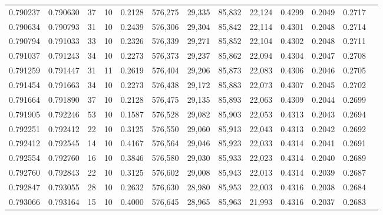 \begin{tabular}{rrrrrrrrrrrrr}
0.790237 & 0.790630 &    37 &  10 &                                     0.2128 & 576,275 &  29,335 &  85,832 &  22,124 & 0.4299 & 0.2049 & 0.2717 \\
0.790634 & 0.790793 &    31 &  10 &                                     0.2439 & 576,306 &  29,304 &  85,842 &  22,114 & 0.4301 & 0.2048 & 0.2714 \\
0.790794 & 0.791033 &    33 &  10 &                                     0.2326 & 576,339 &  29,271 &  85,852 &  22,104 & 0.4302 & 0.2048 & 0.2711 \\
0.791037 & 0.791243 &    34 &  10 &                                     0.2273 & 576,373 &  29,237 &  85,862 &  22,094 & 0.4304 & 0.2047 & 0.2708 \\
0.791259 & 0.791447 &    31 &  11 &                                     0.2619 & 576,404 &  29,206 &  85,873 &  22,083 & 0.4306 & 0.2046 & 0.2705 \\
0.791454 & 0.791663 &    34 &  10 &                                     0.2273 & 576,438 &  29,172 &  85,883 &  22,073 & 0.4307 & 0.2045 & 0.2702 \\
0.791664 & 0.791890 &    37 &  10 &                                     0.2128 & 576,475 &  29,135 &  85,893 &  22,063 & 0.4309 & 0.2044 & 0.2699 \\
0.791905 & 0.792246 &    53 &  10 &                                     0.1587 & 576,528 &  29,082 &  85,903 &  22,053 & 0.4313 & 0.2043 & 0.2694 \\
0.792251 & 0.792412 &    22 &  10 &                                     0.3125 & 576,550 &  29,060 &  85,913 &  22,043 & 0.4313 & 0.2042 & 0.2692 \\
0.792412 & 0.792545 &    14 &  10 &                                     0.4167 & 576,564 &  29,046 &  85,923 &  22,033 & 0.4314 & 0.2041 & 0.2691 \\
0.792554 & 0.792760 &    16 &  10 &                                     0.3846 & 576,580 &  29,030 &  85,933 &  22,023 & 0.4314 & 0.2040 & 0.2689 \\
0.792760 & 0.792843 &    22 &  10 &                                     0.3125 & 576,602 &  29,008 &  85,943 &  22,013 & 0.4314 & 0.2039 & 0.2687 \\
0.792847 & 0.793055 &    28 &  10 &                                     0.2632 & 576,630 &  28,980 &  85,953 &  22,003 & 0.4316 & 0.2038 & 0.2684 \\
0.793066 & 0.793164 &    15 &  10 &                                     0.4000 & 576,645 &  28,965 &  85,963 &  21,993 & 0.4316 & 0.2037 & 0.2683 \\

\end{tabular}
